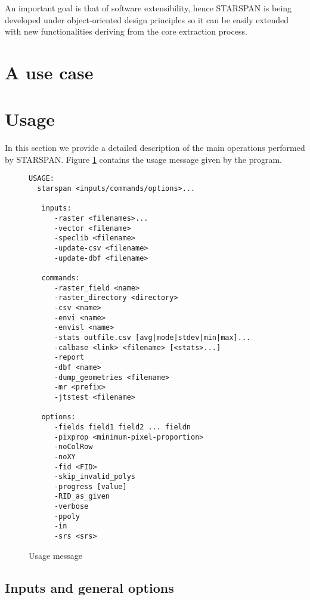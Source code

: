 \documentclass{elsart}
\newcommand{\starspan}{STARSPAN{}}
\begin{document}
	An important goal is that of software extensibility, hence \starspan{} is
	being developed under object-oriented design principles so it can be easily
	extended with new functionalities deriving from the core extraction process.


\section{A use case}

\section{Usage}

In this section we provide a detailed description of the main operations
performed by \starspan. 
Figure \ref{fig-usage} contains the usage message given by the program.
\begin{figure}[!ht]
\centering
\scriptsize{
\begin{verbatim}
USAGE:
  starspan <inputs/commands/options>...

   inputs:
      -raster <filenames>...
      -vector <filename>
      -speclib <filename>
      -update-csv <filename>
      -update-dbf <filename>

   commands:
      -raster_field <name>
      -raster_directory <directory>
      -csv <name>
      -envi <name>
      -envisl <name>
      -stats outfile.csv [avg|mode|stdev|min|max]...
      -calbase <link> <filename> [<stats>...]
      -report
      -dbf <name>
      -dump_geometries <filename>
      -mr <prefix>
      -jtstest <filename>

   options:
      -fields field1 field2 ... fieldn
      -pixprop <minimum-pixel-proportion>
      -noColRow
      -noXY
      -fid <FID>
      -skip_invalid_polys
      -progress [value]
      -RID_as_given
      -verbose
      -ppoly
      -in
      -srs <srs>
\end{verbatim}
}
\label{fig-usage}
\caption{Usage message}
\end{figure}

\subsection{Inputs and general options}
\end{document}

